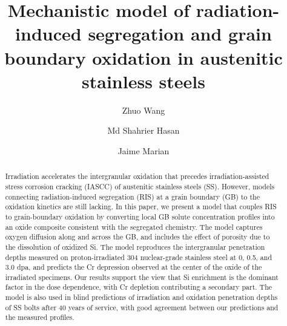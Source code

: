 \documentclass[3p,times]{elsarticle} %
\begin{document}
\begin{frontmatter}

\title{Mechanistic model of radiation-induced segregation and grain boundary oxidation in austenitic stainless steels}

\author[UCLA_MSE]{Zhuo Wang}
\author[UCLA_MSE]{Md Shahrier Hasan}
\author[UCLA_MSE,UCLA_MAE]{Jaime Marian}


 
\address[UCLA_MSE]{Department of Materials Science and Engineering, University of California Los Angeles, Los Angeles, CA 90095, USA}
\address[UCLA_MAE]{Department of Mechanical and Aerospace Engineering, University of California Los Angeles, Los Angeles, CA 90095, USA}


\begin{abstract}
Irradiation accelerates the intergranular oxidation that precedes
irradiation-assisted stress corrosion cracking (IASCC) of austenitic stainless steels (SS).
However, models connecting radiation-induced segregation
(RIS) at a grain boundary (GB) to the oxidation kinetics are still lacking. In this paper, we present a model that couples RIS to grain-boundary oxidation by converting local GB solute concentration profiles into an oxide composite consistent with the segregated chemistry.
The model captures oxygen diffusion along and across the GB, and includes the effect of porosity due to the dissolution of oxidized Si. 
The model reproduces the intergranular penetration depths measured on
proton-irradiated 304 nuclear-grade stainless steel at 0,
0.5, and 3.0 dpa, and predicts the Cr depression observed at the center
of the oxide of the irradiated specimens. Our results support the view that Si enrichment is the dominant factor in the
dose dependence, with Cr depletion contributing a secondary part. The model is also used in blind predictions of irradiation and oxidation penetration depths of SS bolts after 40 years of
service, with good agreement between our predictions and the measured profiles.
\end{abstract}


\end{frontmatter}
\end{document}
